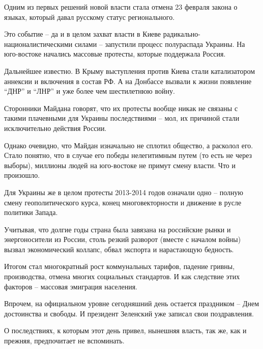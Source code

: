 Одним из первых решений новой власти стала отмена 23 февраля закона о
языках, который давал русскому статус регионального. 

Это событие – да и в целом захват власти в Киеве
радикально-националистическими силами –  запустили процесс полураспада
Украины. На юго-востоке начались массовые протесты, которые поддержала
Россия. 

Дальнейшее известно. В Крыму выступления против Киева стали катализатором
аннексии и включения в состав РФ. А на Донбассе вызвали к жизни появление
\enquote{ДНР} и \enquote{ЛНР} и уже более чем шестилетнюю войну.

Сторонники Майдана говорят, что их протесты вообще никак не связаны с
такими плачевными для Украины последствиями – мол, их причиной стали
исключительно действия России. 

Однако очевидно, что Майдан изначально не сплотил общество, а расколол
его. Стало понятно, что в случае его победы нелегитимным путем (то есть не
через выборы), миллионы людей на юго-востоке не примут смену власти. Что и
произошло. 

Для Украины же в целом протесты 2013-2014 годов означали одно – полную
смену геополитического курса, конец многовекторности и движение в русле
политики Запада.

Учитывая, что долгие годы страна была завязана на российские рынки и
энергоносители из России, столь резкий разворот (вместе с началом войны)
вызвал экономический коллапс, обвал экспорта и нарастающую бедность.  

Итогом стал многократный рост коммунальных тарифов, падение гривны,
производства, отмена многих социальных стандартов. И как следствие этих
факторов – массовая эмиграция населения. 

Впрочем, на официальном уровне сегодняшний день остается праздником – Днем
достоинства и свободы. И президент Зеленский уже записал свои
поздравления. 

О последствиях, к которым этот день привел, нынешняя власть, так же, как и
прежняя, предпочитает не вспоминать.

